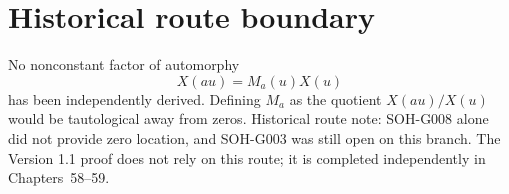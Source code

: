 \section{Historical route boundary}

No nonconstant factor of automorphy
\[
X(au)=M_a(u)X(u)
\]
has been independently derived. Defining \(M_a\) as the quotient \(X(au)/X(u)\) would be tautological away from zeros. Historical route note: SOH-G008 alone did not provide zero location, and SOH-G003 was still open on this branch. The Version 1.1 proof does not rely on this route; it is completed independently in Chapters~58--59.
